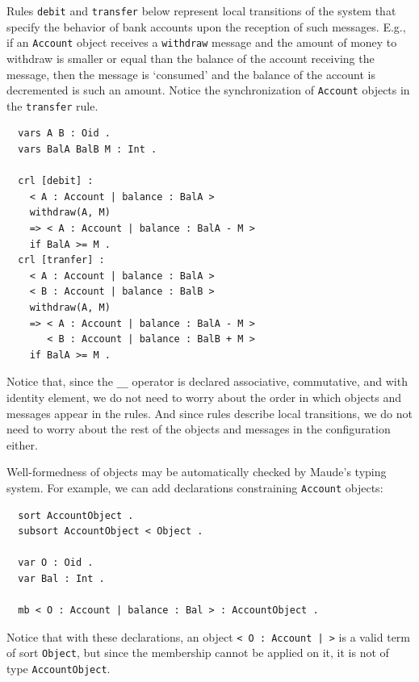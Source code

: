 \noindent Rules \verb"debit" and  \verb"transfer" below represent local
transitions of the system that specify the behavior of bank accounts
upon the reception of such messages. E.g., if an \verb"Account"
object receives a \verb"withdraw" message and the amount of money to
withdraw is smaller or equal than the balance of the account
receiving the message, then the message is `consumed' and the
balance of the account is decremented is such an amount. Notice the
synchronization of \verb"Account" objects in the \verb"transfer"
rule.

{\small
\begin{verbatim}
  vars A B : Oid .
  vars BalA BalB M : Int .

  crl [debit] :
    < A : Account | balance : BalA >
    withdraw(A, M)
    => < A : Account | balance : BalA - M >
    if BalA >= M .
  crl [tranfer] :
    < A : Account | balance : BalA >
    < B : Account | balance : BalB >
    withdraw(A, M)
    => < A : Account | balance : BalA - M >
       < B : Account | balance : BalB + M >
    if BalA >= M .
\end{verbatim}
}

\noindent Notice that, since the \verb"__" operator is declared associative,
commutative, and with identity element, we do not need to worry about the order
in which objects and messages appear in the rules.
And since rules describe local transitions, we do not need to worry
about the rest of the objects and messages in the configuration either.

Well-formedness of objects may be automatically checked by Maude's typing system.
For example, we can add declarations constraining \verb"Account" objects:

{\small
\begin{verbatim}
  sort AccountObject .
  subsort AccountObject < Object .

  var O : Oid .
  var Bal : Int .

  mb < O : Account | balance : Bal > : AccountObject .
\end{verbatim}
}

\noindent Notice that with these declarations, an object
  \verb"< O : Account | >"
is a valid term of sort \verb"Object", but since the membership cannot be applied on it,
it is not of type \verb"AccountObject".

